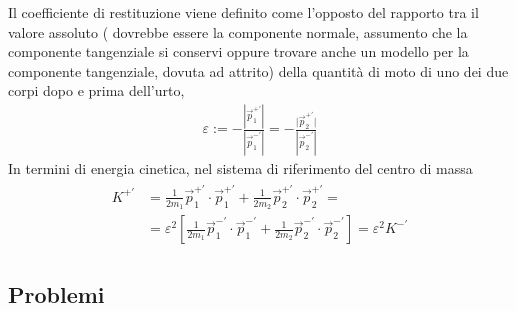 \documentclass[letterpaper,10pt,italian]{jupyterBook}
\begin{document}
\sphinxAtStartPar
Il coefficiente di restituzione viene definito come l’opposto del rapporto tra il valore assoluto ( dovrebbe essere la componente normale, assumento che la componente tangenziale si conservi \sphinxhyphen{} oppure trovare anche un modello per la componente tangenziale, dovuta ad attrito) della quantità di moto di uno dei due corpi dopo e prima dell’urto,
\begin{equation*}
\begin{split}\varepsilon := - \frac{|{\vec{p}_1^{+ '}}   |}{|{\vec{p}_1^{- '}}  |} = - \frac{{|\vec{p}_2^{+ '}} |}{|{\vec{p}_2^{- '}} |}\end{split}
\end{equation*}
\sphinxAtStartPar
In termini di energia cinetica, nel sistema di riferimento del centro di massa
\begin{equation*}
\begin{split}\begin{aligned}
{K^{+ '}} & = \frac{1}{2 m_1} {\vec{p}_1^{+ '}}  \cdot {\vec{p}_1^{+ '}}  + \frac{1}{2 m_2} {\vec{p}_2^{+ '}}  \cdot {\vec{p}_2^{+ '}}  = \\
       & = \varepsilon^2 \left[ \frac{1}{2 m_1} {\vec{p}_1^{- '}}  \cdot {\vec{p}_1^{- '}}  + \frac{1}{2 m_2} {\vec{p}_2^{- '}}  \cdot {\vec{p}_2^{- '}}  \right] = \varepsilon^2 {K^{- '}} 
\end{aligned}\end{split}
\end{equation*}

\subsection{Problemi}
\label{\detokenize{ch/mechanics/dynamics-collisions:problemi}}
\end{document}
